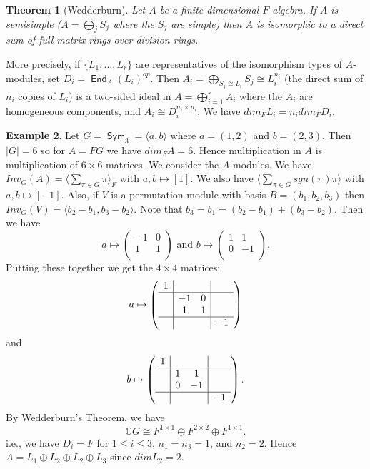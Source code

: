 \documentclass[12pt]{amsart}
\newtheorem{theorem}{Theorem}[section]
\theoremstyle{definition}
\newtheorem{example}[theorem]{Example}
\DeclareMathOperator{\End}{\mathsf{End}}
\DeclareMathOperator{\Sym}{\mathsf{Sym}}
\begin{document}
\begin{theorem}[Wedderburn]
Let $A$ be a finite dimensional $F$-algebra.  If $A$ is semisimple ($A=\bigoplus_j S_j$ where the $S_j$ are simple) then $A$ is isomorphic to a direct sum of full matrix rings over division rings.
\end{theorem}

More precisely, if $\{L_1,\ldots,L_r\}$ are representatives of the isomorphism types of $A$-modules, set $D_i=\End_A(L_i)^{op}$.  Then $A_i=\bigoplus_{S_j\cong L_i} S_j\cong L_i^{n_i}$ (the direct sum of $n_i$ copies of $L_i$) is a two-sided ideal in $A=\bigoplus_{i=1}^r A_i$ where the $A_i$ are homogeneous components, and $A_i\cong D_i^{n_i\times n_i}$.  We have $dim_F L_i=n_i dim_F D_i$.

\begin{example}
Let $G=\Sym_3=\langle a, b\rangle$ where $a=(1,2)$ and $b=(2,3)$.  Then $|G|=6$ so for $A=FG$ we have $dim_F A=6$.  Hence multiplication in $A$ is multiplication of $6\times 6$ matrices.  We consider the $A$-modules.  We have $Inv_G(A)=\langle\sum_{\pi\in G}\pi\rangle_F$ with $a, b\mapsto [1]$.  We also have $\langle\sum_{\pi\in G} sgn(\pi)\pi\rangle$ with $a, b\mapsto [-1]$.  Also, if $V$ is a permutation module with basis $B=(b_1, b_2, b_3)$ then $Inv_G(V)=\langle b_2-b_1, b_3-b_2\rangle$.  Note that $b_3=b_1=(b_2-b_1)+(b_3-b_2)$.  Then we have
$$a\mapsto\left(\begin{array}{cc} -1 & 0 \\ 1 & 1 \\\end{array}\right)\textrm{ and }b\mapsto\left(\begin{array}{cc} 1 & 1 \\ 0 & -1 \\\end{array}\right).$$
Putting these together we get the $4\times 4$ matrices:
$$a\mapsto\left(\begin{array}{c|cc|c}
1 &  &  &  \\ \hline
 & -1 & 0 &  \\
 & 1 & 1 &  \\ \hline
 &  &  & -1 \\
\end{array}\right)$$
and
$$b\mapsto\left(\begin{array}{c|cc|c}
1 &  &  &  \\ \hline
 & 1 & 1 &  \\
 & 0 & -1 &  \\ \hline
 &  &  & -1 \\
\end{array}\right).$$
By Wedderburn's Theorem, we have
$$\mathbb{C}G\cong F^{1\times 1}\oplus F^{2\times 2}\oplus F^{1\times 1}.$$
i.e., we have $D_i=F$ for $1\leq i\leq 3$, $n_1=n_3=1$, and $n_2=2$.  Hence $A=L_1\oplus L_2\oplus L_2\oplus L_3$ since $dim L_2=2$.
\end{example}
\end{document}
